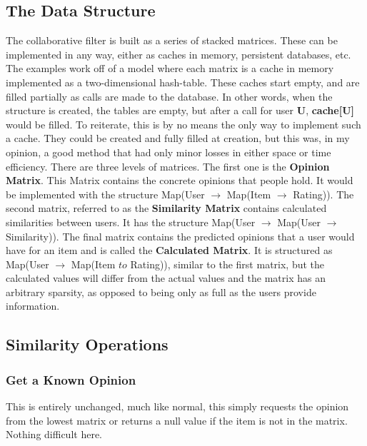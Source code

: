 \documentclass[12pt]{article}
\begin{document}
  \subsection{The Data Structure}

  \indent\indent The collaborative filter is built as a series of stacked matrices.  These can be implemented in any way, either as caches in memory, persistent databases, etc.  The examples work off of a model where each matrix is a cache in memory implemented as a two-dimensional hash-table.  These caches start empty, and are filled partially as calls are made to the database.  In other words, when the structure is created, the tables are empty, but after a call for user \textbf{U}, \textbf{cache[U]} would be filled.
  \p To reiterate, this is by no means the only way to implement such a cache.  They could be created and fully filled at creation, but this was, in my opinion, a good method that had only minor losses in either space or time efficiency.
  \p There are three levels of matrices.  The first one is the \textbf{Opinion Matrix}.  This Matrix contains the concrete opinions that people hold.  It would be implemented with the structure Map(User $\to$ Map(Item $\to$ Rating)).  
  \p The second matrix, referred to as the \textbf{Similarity Matrix} contains calculated similarities between users.  It has the structure Map(User $\to$ Map(User $\to$ Similarity)).  
  \p The final matrix contains the predicted opinions that a user would have for an item and is called the \textbf{Calculated Matrix}.  It is structured as Map(User $\to$ Map(Item $to$ Rating)), similar to the first matrix, but the calculated values will differ from the actual values and the matrix has an arbitrary sparsity, as opposed to being only as full as the users provide information.

  \subsection{Similarity Operations}
  \subsubsection{Get a Known Opinion}
  \indent\indent This is entirely unchanged, much like normal, this simply requests the opinion from the lowest matrix or returns a null value if the item is not in the matrix.  Nothing difficult here.
\end{document}
